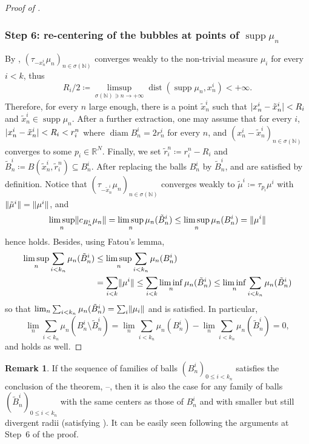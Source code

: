 \documentclass[10pt]{amsart}
\theoremstyle{plain}
\theoremstyle{definition}
\newtheorem{remark}[theorem]{Remark}
\newcommand{\N}{\mathbb{N}}
\newcommand{\R}{\mathbb{R}}
\DeclarePairedDelimiter{\abs}{\lvert}{\rvert}
\DeclarePairedDelimiter{\norm}{\lVert}{\rVert}
\DeclareMathOperator{\supp}{supp}
\DeclareMathOperator{\diam}{diam}
\DeclareMathOperator{\dist}{dist}
\begin{document}
\begin{proof}[Proof of ]
\subsubsection*{Step 6: re-centering of the bubbles at points of \(\supp\mu_n\)}
By , $(\tau_{-x^i_{n}} \mu_n)_{n \in \sigma(\N)}$ converges weakly to the non-trivial measure $\mu_i$ for every $i<k$, thus
\begin{equation}
\label{finiteDistance}
R_i/2\coloneqq \limsup_{\sigma(\N) \ni n \to +\infty} \dist(\supp \mu_n, x_n^i) < +\infty.
\end{equation}
Therefore, for every $n$ large enough, there is a point $\tilde x_n^i$ such that $\abs{x_n^i-\tilde x_n^i} < R_i$ and $\tilde x_n^i \in \supp \mu_n$. After a further extraction, one may assume that for every $i$, $\abs{x_n^i-\tilde x_n^i} < R_i < r_i^n$ where $\diam B_n^i = 2r_n^i$ for every $n$, and $(x_n^i -\tilde x_n^i)_{n\in \sigma(\N)}$ converges to some $p_i \in \R^N$. Finally, we set $\tilde r_i^n \coloneqq r_i^n-R_i$ and $\tilde B_n^i \coloneqq B(\tilde x_n^i,\tilde r_i^n) \subseteq B_n^i$. After replacing the balls $B_n^i$ by $\tilde B_n^i$,  and  are satisfied by definition. Notice that $(\tau_{-\tilde x^i_{n}} \mu_n)_{n \in \sigma(\N)}$ converges weakly to $\tilde \mu^i \coloneqq \tau_{p_i} \mu^i$ with $\norm{\tilde \mu^i} = \norm{\mu^i}$, and
\[
\limsup_n \norm{c_{B_n^i} \mu_n} = \limsup_n \mu_n(\tilde B_n^i) \leq \limsup_n \mu_n(B_n^i) = \norm{\mu^i}
\]
hence  holds. Besides, using Fatou's lemma,
\begin{align*}
\limsup_n \sum_{i<k_n} \mu_n(\tilde B_n^i) &\leq \limsup_n \sum_{i<k_n} \mu_n(B_n^i)\\
&= \sum_{i<k} \norm{\mu^i}\leq \sum_{i<k} \liminf_n \mu_n(\tilde B_n^i) \leq \liminf_n \sum_{i<k_n} \mu_n(\tilde B_n^i)
\end{align*}
so that $\lim_n \sum_{i<k_n} \mu_n(\tilde B_n^i) = \sum_i \norm{\mu_i}$ and  is satisfied. In particular,
\[\lim_n \sum_{i<k_n} \mu_n(B_n^i\setminus \tilde B_n^i) = \lim_n \sum_{i<k_n} \mu_n(B_n^i) - \lim_n \sum_{i<k_n} \mu_n(\tilde B_n^i) = 0,\]
and  holds as well.
\end{proof}
\begin{remark}\label{reduceRadius}
If the sequence of families of balls $(B^i_n)_{0 \leq i < k_n}$ satisfies the conclusion of the theorem, \ie {}--, then it is also the case for any family of balls $(\tilde B^i_n)_{0 \leq i < k_n}$ with the same centers as those of \(B^i_n\) and with smaller but still divergent radii (\ie satisfying ). It can be easily seen following the arguments at Step~6 of the proof.
\end{remark}
\end{document}
